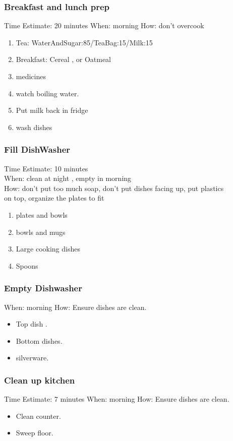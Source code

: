 \begin{frame} 
\frametitle{Breakfast and lunch prep} 
{\small Time Estimate: 20 minutes  
When: morning
How: don't overcook}
\begin{enumerate} 
\small \item \small Tea: WaterAndSugar:85/TeaBag:15/Milk:15 
\item \small Breakfast: Cereal , or Oatmeal
\item \small medicines 
\item \small watch boiling water. 
\item \small Put milk back in fridge 
\item \small wash dishes 
\end{enumerate}
\end{frame}

\begin{frame}
\frametitle{Fill DishWasher}
{\small Time Estimate: 10 minutes \\ 
When: clean at night , empty in morning \\
How: don't put too much soap, don't put dishes facing up, put plastics \\
on top, organize the plates to fit\\ } 
\begin{enumerate}
\small \item \small plates and bowls 
\item \small bowls and mugs  
\item \small Large cooking dishes  
\item \small Spoons 
\end{enumerate}
\end{frame} 

\begin{frame} 
\frametitle{Empty Dishwasher} 
When: morning 
How: Ensure dishes are clean. 
\begin{itemize} 
\small \item \small Top dish .
\item \small Bottom dishes. 
\item \small silverware.
\end{itemize} 
\end{frame} 

\begin{frame}[label=kitchenClean ]  
\frametitle{Clean up kitchen} 
Time Estimate: 7 minutes  
When: morning 
How: Ensure dishes are clean. 
\begin{itemize} 
 \item \small Clean counter.
\item \small Sweep floor. 
\end{itemize}
\end{frame}

